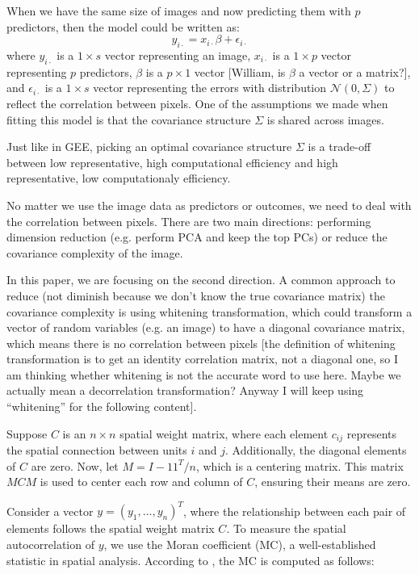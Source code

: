 \documentclass[12pt]{article}
\begin{document}
When we have the same size of images and now predicting them with \( p \) predictors, then the model could be written as:
\[
  y_{i \cdot} = x_{i \cdot} \beta + \epsilon_{i \cdot}
\]
where \( y_{i \cdot} \) is a \( 1 \times s \) vector representing an image, \( x_{i \cdot} \) is a \( 1 \times p \) vector representing \( p \) predictors, \( \beta \) is a \( p \times 1 \) vector [William, is \( \beta \) a vector or a matrix?], and \( \epsilon_{i \cdot} \) is a \( 1 \times s \) vector representing the errors with distribution \( \mathcal{N} (0, \Sigma) \) to reflect the correlation between pixels. One of the assumptions we made when fitting this model is that the covariance structure \( \Sigma \) is shared across images.

Just like in GEE, picking an optimal covariance structure \( \Sigma \) is a trade-off between low representative, high computational efficiency and high representative, low computationaly efficiency.

No matter we use the image data as predictors or outcomes, we need to deal with the correlation between pixels. There are two main directions: performing dimension reduction (e.g. perform PCA and keep the top PCs) or reduce the covariance complexity of the image.

In this paper, we are focusing on the second direction. A common approach to reduce (not diminish because we don't know the true covariance matrix) the covariance complexity is using whitening transformation, which could transform a vector of random variables (e.g. an image) to have a diagonal covariance matrix, which means there is no correlation between pixels [the definition of whitening transformation is to get an identity correlation matrix, not a diagonal one, so I am thinking whether whitening is not the accurate word to use here. Maybe we actually mean a decorrelation transformation? Anyway I will keep using ``whitening'' for the following content].

Suppose \( C \) is an \( n \times n \) spatial weight matrix, where each element \( c_{ij} \) represents the spatial connection between units \( i \) and \( j \). Additionally, the diagonal elements of \( C \) are zero. Now, let \( M = I - 1 1^T / n \), which is a centering matrix. This matrix \( MCM \) is used to center each row and column of \( C \), ensuring their means are zero.

Consider a vector \( y = \left( y_1, \dots, y_n \right)^T \), where the relationship between each pair of elements follows the spatial weight matrix \( C \). To measure the spatial autocorrelation of \( y \), we use the Moran coefficient (MC), a well-established statistic in spatial analysis. According to \citet{griffith2014spatial}, the MC is computed as follows:
\end{document}
